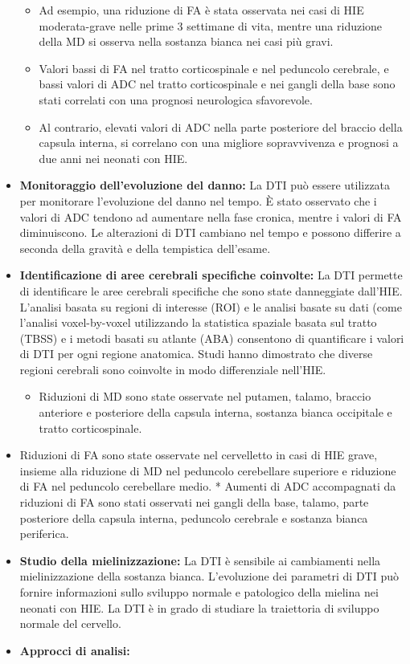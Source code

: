 \begin{itemize}
	\begin{itemize}
		\tightlist
		\item
		Ad esempio, una riduzione di FA è stata osservata nei casi di HIE moderata-grave nelle prime 3 settimane di vita, mentre una riduzione della MD si osserva nella sostanza bianca nei casi più gravi.
		\item
		Valori bassi di FA nel tratto corticospinale e nel peduncolo cerebrale, e bassi valori di ADC nel tratto corticospinale e nei gangli della base sono stati correlati con una prognosi neurologica sfavorevole.
		\item
		Al contrario, elevati valori di ADC nella parte posteriore del braccio della capsula interna, si correlano con una migliore sopravvivenza e prognosi a due anni nei neonati con HIE.
	\end{itemize}
	\item
	\textbf{Monitoraggio dell'evoluzione del danno:} La DTI può essere utilizzata per monitorare l'evoluzione del danno nel tempo. È stato osservato che i valori di ADC tendono ad aumentare nella fase cronica, mentre i valori di FA diminuiscono. Le alterazioni di DTI cambiano nel tempo e possono differire a seconda della gravità e della tempistica dell'esame.
	\item
	\textbf{Identificazione di aree cerebrali specifiche coinvolte:} La DTI permette di identificare le aree cerebrali specifiche che sono state danneggiate dall'HIE. L'analisi basata su regioni di interesse (ROI) e le analisi basate su dati (come l'analisi voxel-by-voxel utilizzando la statistica spaziale basata sul tratto (TBSS) e i metodi basati su atlante (ABA) consentono di quantificare i valori di DTI per ogni regione anatomica. Studi hanno dimostrato che diverse regioni cerebrali sono coinvolte in modo differenziale nell'HIE.
	
	\begin{itemize}
		\tightlist
		\item
		Riduzioni di MD sono state osservate nel putamen, talamo, braccio anteriore e posteriore della capsula interna, sostanza bianca occipitale e tratto corticospinale.
	\end{itemize}
	\item
	Riduzioni di FA sono state osservate nel cervelletto in casi di HIE grave, insieme alla riduzione di MD nel peduncolo cerebellare superiore e riduzione di FA nel peduncolo cerebellare medio. * Aumenti di ADC accompagnati da riduzioni di FA sono stati osservati nei gangli della base, talamo, parte posteriore della capsula interna, peduncolo cerebrale e sostanza bianca periferica.
	\item
	\textbf{Studio della mielinizzazione:} La DTI è sensibile ai cambiamenti nella mielinizzazione della sostanza bianca. L'evoluzione dei parametri di DTI può fornire informazioni sullo sviluppo normale e patologico della mielina nei neonati con HIE. La DTI è in grado di studiare la traiettoria di sviluppo normale del cervello.
	\item
	\textbf{Approcci di analisi:}
	

\end{itemize}
